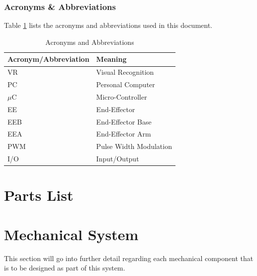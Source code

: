 \documentclass[titlepage]{article}
\begin{document}
\subsubsection{Acronyms \& Abbreviations}
Table \ref{tab:Acronyms} lists the acronyms and abbreviations used in this document.
\begin{table}[h!]
\centering
\caption{Acronyms and Abbreviations}
\begin{tabular}{| p{6cm} | p{6cm} |}\hline
	\textbf{Acronym/Abbreviation}	&\textbf{Meaning}\\\hline
	VR								&Visual Recognition\\\hline
	PC								&Personal Computer\\\hline
	$\mu$C							&Micro-Controller\\\hline
	EE								&End-Effector\\\hline
	EEB								&End-Effector Base\\\hline
	EEA								&End-Effector Arm\\\hline
	PWM								&Pulse Width Modulation\\\hline
	I/O								&Input/Output\\\hline
\end{tabular}
\label{tab:Acronyms}
\end{table}
\newpage



\section{Parts List}



\section{Mechanical System}
This section will go into further detail regarding each mechanical component that is to be designed as part of this system.
\end{document}
